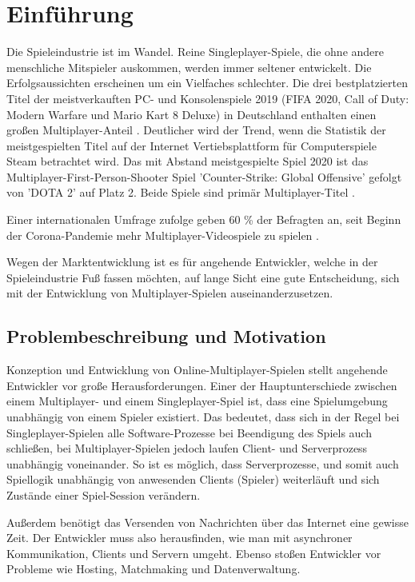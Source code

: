 \chapter{Einführung}
\label{sec:einfuehrung}

Die Spieleindustrie ist im Wandel. Reine Singleplayer-Spiele, die ohne andere menschliche Mitspieler auskommen, werden immer seltener entwickelt. Die Erfolgsaussichten erscheinen um ein Vielfaches schlechter. Die drei bestplatzierten Titel der meistverkauften PC- und Konsolenspiele 2019 (FIFA 2020, Call of Duty: Modern Warfare und Mario Kart 8 Deluxe) in Deutschland enthalten einen großen Multiplayer-Anteil \cite{gameVerbandderdeutschenGamesBranchee.V..2020}. Deutlicher wird der Trend, wenn die Statistik der meistgespielten Titel auf der Internet Vertiebsplattform für Computerspiele Steam betrachtet wird. Das mit Abstand meistgespielte Spiel 2020 ist das Multiplayer-First-Person-Shooter Spiel 'Counter-Strike: Global Offensive' gefolgt von 'DOTA 2' auf Platz 2. Beide Spiele sind primär Multiplayer-Titel \cite{GitHyp.February2021}.

Einer internationalen Umfrage zufolge geben 60 \% der Befragten an, seit Beginn der Corona-Pandemie mehr Multiplayer-Videospiele zu spielen \cite{SimonKucher&Partners.2020}. 

Wegen der Marktentwicklung ist es für angehende Entwickler, welche in der Spieleindustrie Fuß fassen möchten, auf lange Sicht eine gute Entscheidung, sich mit der Entwicklung von Multiplayer-Spielen auseinanderzusetzen.

\section{Problembeschreibung und Motivation}

Konzeption und Entwicklung von Online-Multiplayer-Spielen stellt angehende Entwickler vor große Herausforderungen. Einer der Hauptunterschiede zwischen einem Multiplayer- und einem Singleplayer-Spiel ist, dass eine Spielumgebung unabhängig von einem Spieler existiert. Das bedeutet, dass sich in der Regel bei Singleplayer-Spielen alle Software-Prozesse bei Beendigung des Spiels auch schließen, bei Multiplayer-Spielen jedoch laufen Client- und Serverprozess unabhängig voneinander. So ist es möglich, dass Serverprozesse, und somit auch Spiellogik unabhängig von anwesenden Clients (Spieler) weiterläuft und sich Zustände einer Spiel-Session verändern. 

Außerdem benötigt das Versenden von Nachrichten über das Internet eine gewisse Zeit. Der Entwickler muss also herausfinden, wie man mit asynchroner Kommunikation, Clients und Servern umgeht. Ebenso stoßen Entwickler vor Probleme wie Hosting, Matchmaking und Datenverwaltung.
\cite{Payne.18.09.2019}

